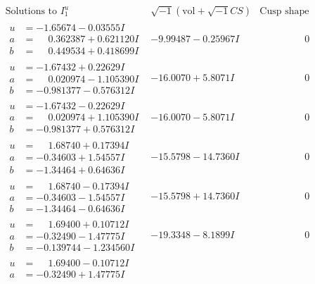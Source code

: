 \documentclass[1p]{elsarticle_modified}
\theoremstyle{definition}
\newcommand{\I}{\sqrt{-1}}
\begin{document}
$$\begin{array}{c|c|c}
\text{Solutions to }I^u_{1}& \I (\text{vol} + \sqrt{-1}CS) & \text{Cusp shape}\\
 \hline 
\begin{aligned}
u &= -1.65674 - 0.03555 I \\
a &= \phantom{-}0.362387 + 0.621120 I \\
b &= \phantom{-}0.449534 + 0.418699 I\end{aligned}
 & -9.99487 - 0.25967 I & \phantom{-0.000000 } 0 \\ \hline\begin{aligned}
u &= -1.67432 + 0.22629 I \\
a &= \phantom{-}0.020974 - 1.105390 I \\
b &= -0.981377 - 0.576312 I\end{aligned}
 & -16.0070 + 5.8071 I & \phantom{-0.000000 } 0 \\ \hline\begin{aligned}
u &= -1.67432 - 0.22629 I \\
a &= \phantom{-}0.020974 + 1.105390 I \\
b &= -0.981377 + 0.576312 I\end{aligned}
 & -16.0070 - 5.8071 I & \phantom{-0.000000 } 0 \\ \hline\begin{aligned}
u &= \phantom{-}1.68740 + 0.17394 I \\
a &= -0.34603 + 1.54557 I \\
b &= -1.34464 + 0.64636 I\end{aligned}
 & -15.5798 - 14.7360 I & \phantom{-0.000000 } 0 \\ \hline\begin{aligned}
u &= \phantom{-}1.68740 - 0.17394 I \\
a &= -0.34603 - 1.54557 I \\
b &= -1.34464 - 0.64636 I\end{aligned}
 & -15.5798 + 14.7360 I & \phantom{-0.000000 } 0 \\ \hline\begin{aligned}
u &= \phantom{-}1.69400 + 0.10712 I \\
a &= -0.32490 - 1.47775 I \\
b &= -0.139744 - 1.234560 I\end{aligned}
 & -19.3348 - 8.1899 I & \phantom{-0.000000 } 0 \\ \hline\begin{aligned}
u &= \phantom{-}1.69400 - 0.10712 I \\
a &= -0.32490 + 1.47775 I \\

\end{aligned}
\end{array}$$
\end{document}
